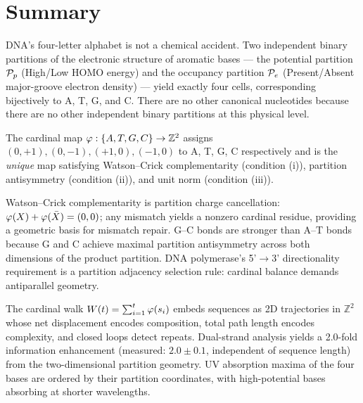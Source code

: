 \section{Summary}
\label{sec:ch14_summary}

\begin{chapterbox}
DNA's four-letter alphabet is not a chemical accident. Two independent
binary partitions of the electronic structure of aromatic bases --- the
potential partition $\mathcal{P}_p$ (High/Low HOMO energy) and the occupancy
partition $\mathcal{P}_e$ (Present/Absent major-groove electron density) ---
yield exactly four cells, corresponding bijectively to A, T, G, and C.
There are no other canonical nucleotides because there are no other
independent binary partitions at this physical level.

The cardinal map $\varphi: \{A,T,G,C\} \to \mathbb{Z}^2$ assigns
$(0,+1), (0,-1), (+1,0), (-1,0)$ to A, T, G, C respectively and is the
\emph{unique} map satisfying Watson--Crick complementarity (condition (i)),
partition antisymmetry (condition (ii)), and unit norm (condition (iii)).

Watson--Crick complementarity is partition charge cancellation:
$\varphi(X) + \varphi(\bar{X}) = (0,0)$; any mismatch yields a
nonzero cardinal residue, providing a geometric basis for mismatch
repair. G--C bonds are stronger than A--T bonds because G and C achieve
maximal partition antisymmetry across both dimensions of the product
partition. DNA polymerase's 5'$\to$3' directionality requirement is a
partition adjacency selection rule: cardinal balance demands antiparallel
geometry.

The cardinal walk $W(t) = \sum_{i=1}^t \varphi(s_i)$ embeds sequences
as 2D trajectories in $\mathbb{Z}^2$ whose net displacement encodes
composition, total path length encodes complexity, and closed loops
detect repeats. Dual-strand analysis yields a 2.0-fold information
enhancement (measured: $2.0 \pm 0.1$, independent of sequence length)
from the two-dimensional partition geometry. UV absorption maxima of the
four bases are ordered by their partition coordinates, with high-potential
bases absorbing at shorter wavelengths.
\end{chapterbox}

